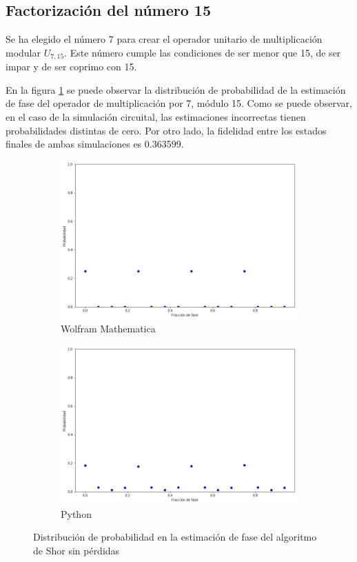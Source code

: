 \subsection{Factorización del número 15}

Se ha elegido el número 7 para crear el operador unitario de multiplicación modular $U_{7,15}$. Este número cumple las condiciones de ser menor que 15, de ser impar y de ser coprimo con 15.

En la figura \ref{fig:shor15} se puede observar la distribución de probabilidad de la estimación de fase del operador de multiplicación por 7, módulo 15. Como se puede observar, en el caso de la simulación circuital, las estimaciones incorrectas tienen probabilidades distintas de cero. Por otro lado, la fidelidad entre los estados finales de ambas simulaciones es 0.363599.

\begin{figure}[H]
    \centering
    \begin{subfigure}[m]{0.45\textwidth}
        \centering
        \includegraphics[width=0.9\linewidth]{img/ShorM15.png}
        \caption{Wolfram Mathematica}
    \end{subfigure}
    \begin{subfigure}[m]{0.45\textwidth}
        \centering
        \includegraphics[width=0.9\linewidth]{img/shorlossless.png}
        \caption{Python}
    \end{subfigure}
    \caption[Distribución de probabilidad en la estimación de fase del algoritmo de Shor sin pérdidas]{Distribución de probabilidad en la estimación de fase del algoritmo de Shor sin pérdidas}
    \label{fig:shor15}
\end{figure}

